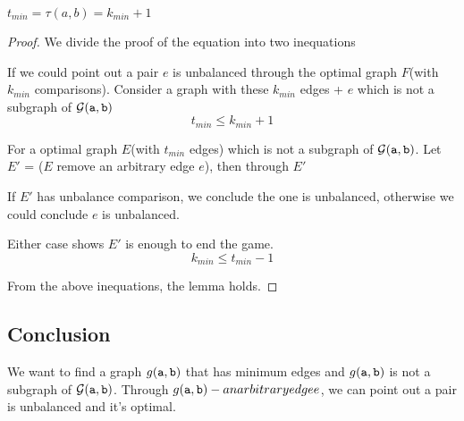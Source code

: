 \begin{lemma}
$t_{min} = \tau(a,b) = k_{min}+1 $
\end{lemma}

\begin{proof}
We divide the proof of the equation into two inequations

If we could point out a pair $e$ is unbalanced through the optimal graph $F$(with $k_{min}$ comparisons).
Consider a graph with these $k_{min}$ edges + $e$ which is not a subgraph of ${\cal G}(\mathtt{a},\mathtt{b})$
\[t_{min}\leq k_{min}+1\]

For a optimal graph $E$(with $t_{min}$ edges) which is not a subgraph of ${\cal G}(\mathtt{a},\mathtt{b})$. Let $E'$ = ($E$ remove an arbitrary edge $e$), then through $E'$

If $E'$ has unbalance comparison, we conclude the one is unbalanced, otherwise we could conclude $e$ is unbalanced.

Either case shows $E'$ is enough to end the game.
\[k_{min} \leq t_{min}-1\]

From the above inequations, the lemma holds.

\end{proof}

\subsection*{Conclusion}
We want to find a graph $g(\mathtt{a},\mathtt{b})$ that has minimum edges and $g(\mathtt{a},\mathtt{b})$ is not a subgraph of ${\cal G}(\mathtt{a},\mathtt{b})$. Through $g(\mathtt{a},\mathtt{b})-an arbitrary edge e$, we can point out a pair is unbalanced and it's optimal.